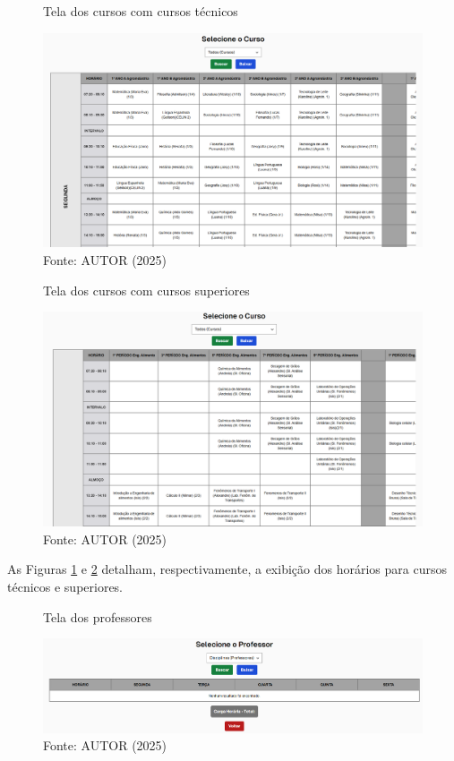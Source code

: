 \begin{figure}[htb]
    \centering
    \caption{Tela dos cursos com cursos técnicos}
    \includegraphics[width=1\textwidth]{Figuras/front-3.png}
    \caption*{Fonte: AUTOR (2025)}
    \label{fig_front_3}
\end{figure}

\begin{figure}[H]
    \centering
    \caption{Tela dos cursos com cursos superiores}
    \includegraphics[width=1\textwidth]{Figuras/front-4.png}
    \caption*{Fonte: AUTOR (2025)}
    \label{fig_front_4}
\end{figure}

As Figuras \ref{fig_front_3} e \ref{fig_front_4} detalham, respectivamente, a exibição dos horários para cursos técnicos e superiores.

\begin{figure}[htb]
    \centering
    \caption{Tela dos professores}
    \includegraphics[width=1\textwidth]{Figuras/front-5.png}
    \caption*{Fonte: AUTOR (2025)}
    \label{fig_front_5}
\end{figure}


